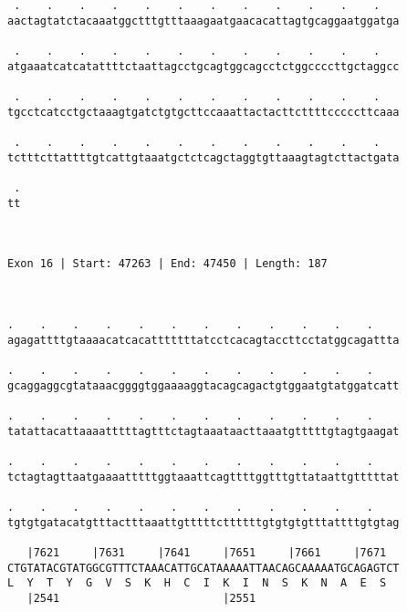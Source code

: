 \documentclass{article}
\begin{document}
\begin{Verbatim}
                                                            
  
 .    .    .    .    .    .    .    .    .    .    .    .   
aactagtatctacaaatggctttgtttaaagaatgaacacattagtgcaggaatggatga
                                                            
 .    .    .    .    .    .    .    .    .    .    .    .   
atgaaatcatcatattttctaattagcctgcagtggcagcctctggccccttgctaggcc
                                                            
 .    .    .    .    .    .    .    .    .    .    .    .   
tgcctcatcctgctaaagtgatctgtgcttccaaattactacttcttttcccccttcaaa
                                                            
 .    .    .    .    .    .    .    .    .    .    .    .   
tctttcttattttgtcattgtaaatgctctcagctaggtgttaaagtagtcttactgata
                                                            
 .
tt
  
  
 
Exon 16 | Start: 47263 | End: 47450 | Length: 187



.    .    .    .    .    .    .    .    .    .    .    .    
agagattttgtaaaacatcacatttttttatcctcacagtaccttcctatggcagattta
                                                            
.    .    .    .    .    .    .    .    .    .    .    .    
gcaggaggcgtataaacggggtggaaaaggtacagcagactgtggaatgtatggatcatt
                                                            
.    .    .    .    .    .    .    .    .    .    .    .    
tatattacattaaaatttttagtttctagtaaataacttaaatgtttttgtagtgaagat
                                                            
.    .    .    .    .    .    .    .    .    .    .    .    
tctagtagttaatgaaaatttttggtaaattcagttttggtttgttataattgtttttat
                                                            
.    .    .    .    .    .    .    .    .    .    .    .    
tgtgtgatacatgtttactttaaattgtttttcttttttgtgtgtgtttattttgtgtag
                                                            
   |7621     |7631     |7641     |7651     |7661     |7671  
CTGTATACGTATGGCGTTTCTAAACATTGCATAAAAATTAACAGCAAAAATGCAGAGTCT
L  Y  T  Y  G  V  S  K  H  C  I  K  I  N  S  K  N  A  E  S  
   |2541                         |2551                      
  

\end{Verbatim}
\end{document}
